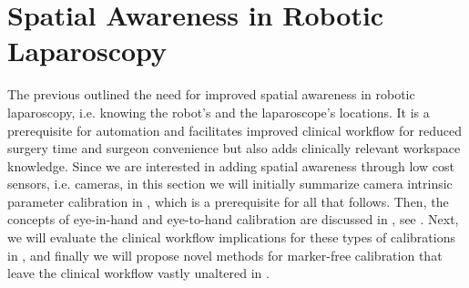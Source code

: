 







\section{Spatial Awareness in Robotic Laparoscopy}
\label{in:sec:spatial_awareness} 

The previous  outlined the need for improved spatial awareness in robotic laparoscopy, i.e. knowing the robot's and the laparoscope's locations. It is a prerequisite for automation and facilitates improved clinical workflow for reduced surgery time and surgeon convenience but also adds clinically relevant workspace knowledge. Since we are interested in adding spatial awareness through low cost sensors, i.e. cameras, in this section we will initially summarize camera intrinsic parameter calibration in , which is a prerequisite for all that follows. Then, the concepts of eye-in-hand and eye-to-hand calibration are discussed in , see . Next, we will evaluate the clinical workflow implications for these types of calibrations in , and finally we will propose novel methods for marker-free calibration that leave the clinical workflow vastly unaltered in .
\label{in:sec:eye_in_to_hand}

